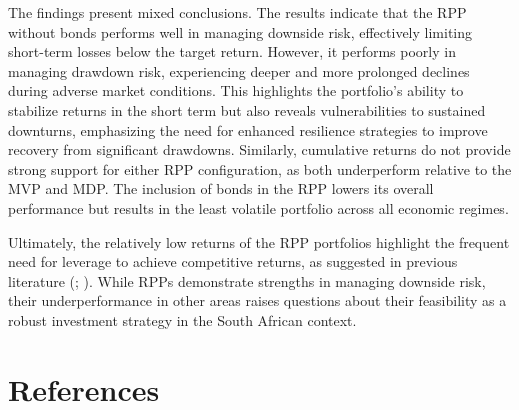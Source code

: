 \documentclass[11pt,preprint]{elsarticle}
\numberwithin{equation}{section}
\numberwithin{figure}{section}
\numberwithin{table}{section}
\begin{document}
The findings present mixed conclusions. The results indicate that the
RPP without bonds performs well in managing downside risk, effectively
limiting short-term losses below the target return. However, it performs
poorly in managing drawdown risk, experiencing deeper and more prolonged
declines during adverse market conditions. This highlights the
portfolio's ability to stabilize returns in the short term but also
reveals vulnerabilities to sustained downturns, emphasizing the need for
enhanced resilience strategies to improve recovery from significant
drawdowns. Similarly, cumulative returns do not provide strong support
for either RPP configuration, as both underperform relative to the MVP
and MDP. The inclusion of bonds in the RPP lowers its overall
performance but results in the least volatile portfolio across all
economic regimes.

Ultimately, the relatively low returns of the RPP portfolios highlight
the frequent need for leverage to achieve competitive returns, as
suggested in previous literature (; ). While RPPs demonstrate strengths in managing
downside risk, their underperformance in other areas raises questions
about their feasibility as a robust investment strategy in the South
African context.

\section*{References}\label{references}
\end{document}
